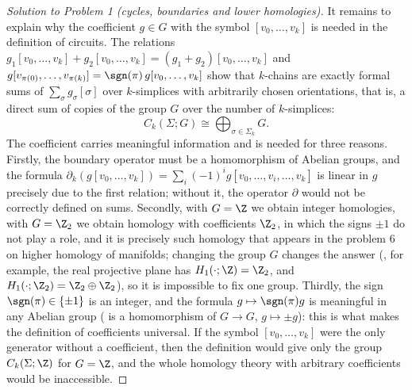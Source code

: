 \documentclass[a4paper,12pt]{report}
\begin{document}
\begin{proof}[Solution to Problem \textup{1} \textup{(}cycles, boundaries and lower homologies\textup{)}]
It remains to explain why the coefficient $g\in G$ with the symbol $[v_0,\dots,v_k]$ is needed in the definition of circuits. The relations $g_1[v_0,\dots,v_k]+g_2[v_0,\dots,v_k]=(g_1+g_2)[v_0,\dots,v_k]$ and $g[v_{\pi(0)},\dots,v_{\pi(k)}]=\sgn(\pi)\,g[v_0,\dots,v_k]$ show that $k$-chains are exactly formal sums of $\sum_\sigma g_\sigma[\sigma]$ over $k$-simplices with arbitrarily chosen orientations, that is, a direct sum of copies of the group $G$ over the number of $k$-simplices:
\[
C_k(\Sigma;G)\cong\bigoplus_{\sigma\in\Sigma_k}G .
\]
The coefficient carries meaningful information and is needed for three reasons. Firstly, the boundary operator must be a homomorphism of Abelian groups, and the formula $\partial_k(g[v_0,\dots,v_k])=\sum_i(-1)^i g[v_0,\dots,\widehat{v_i},\dots,v_k]$ is linear in $g$ precisely due to the first relation; without it, the operator $\partial$ would not be correctly defined on sums. Secondly, with $G=\Z$ we obtain integer homologies, with $G=\Z_2$ we obtain homology with coefficients $\Z_2$, in which the signs $\pm1$ do not play a role, and it is precisely such homology that appears in the problem \textup{6} on higher homology of manifolds; changing the group $G$ changes the answer \textup{ (}, for example, the real projective plane has $H_1(\cdot;\Z)=\Z_2$, and $H_1(\cdot;\Z_2)=\Z_2\oplus\Z_2$\textup{)}, so it is impossible to fix one group. Thirdly, the sign $\sgn(\pi)\in\{\pm1\}$ is an integer, and the formula $g\mapsto\sgn(\pi)g$ is meaningful in any Abelian group \textup{ (} is a homomorphism of $G\to G$, $g\mapsto\pm g$\textup{)}: this is what makes the definition of coefficients universal. If the symbol $[v_0,\dots,v_k]$ were the only generator without a coefficient, then the definition would give only the group $C_k(\Sigma;\Z)$ for $G=\Z$, and the whole homology theory with arbitrary coefficients would be inaccessible.
\end{proof}
\end{document}
